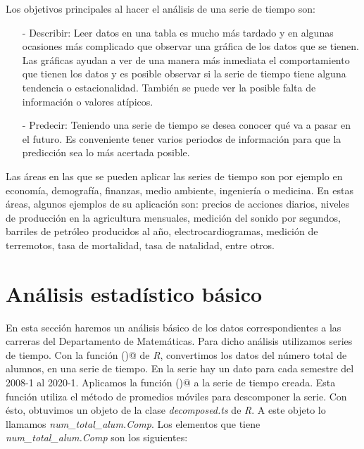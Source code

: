 Los objetivos principales al hacer el análisis de una serie de tiempo son:
  
  \begin{itemize}
\item[-] Describir: Leer datos en una tabla es mucho más tardado y en algunas ocasiones más complicado que observar una gráfica de los datos que se tienen. Las gráficas ayudan a ver de una manera más inmediata el comportamiento que tienen los datos y es posible observar si la serie de tiempo tiene alguna tendencia o estacionalidad. También se puede ver la posible falta de información o valores atípicos.

\item[-] Predecir: Teniendo una serie de tiempo se desea conocer qué va a pasar en el futuro. Es conveniente tener varios periodos de información para que la predicción sea lo más acertada posible.
\end{itemize}

Las áreas en las que se pueden aplicar las series de tiempo son por ejemplo en economía, demografía, finanzas, medio ambiente, ingeniería o medicina. En estas áreas, algunos ejemplos de su aplicación son: precios de acciones diarios, niveles de producción en la agricultura mensuales, medición del sonido por segundos, barriles de petróleo producidos al año, electrocardiogramas, medición de terremotos, tasa de mortalidad, tasa de natalidad, entre otros.


\section{Análisis estadístico básico}

En esta sección haremos un análisis básico de los datos correspondientes a las carreras del Departamento de Matemáticas. Para dicho análisis utilizamos series de tiempo. Con la función \verb@ts()@ de \textit{R}, convertimos los datos del número total de alumnos, en una serie de tiempo. En la serie hay un dato para cada semestre del 2008-1 al 2020-1. Aplicamos la función \verb@decompose()@ a la serie de tiempo creada. Esta función utiliza el método de promedios móviles para descomponer la serie. Con ésto, obtuvimos un objeto de la clase \textit{decomposed.ts} de \textit{R}. A este objeto lo llamamos \textit{num\_total\_alum.Comp}. Los elementos que tiene \textit{num\_total\_alum.Comp} son los siguientes:

